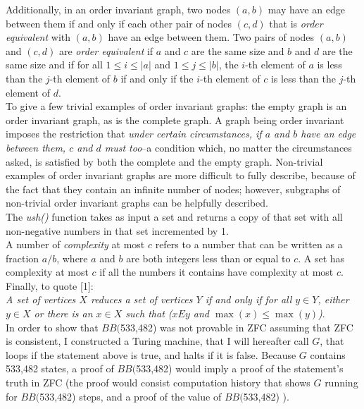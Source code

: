 \documentclass{report}
\newcommand{\statenum}{533,482 }
\newcommand{\bbstatenum}{$BB($533,482) }
\begin{document}
Additionally, in an order invariant graph, two nodes $(a,b)$ may have an edge between them if and only if each other pair of nodes $(c,d)$ that is \emph{order equivalent} with $(a,b)$ have an edge between them. Two pairs of nodes $(a, b)$ and $(c, d)$ are \emph{order equivalent} if $a$ and $c$ are the same size and $b$ and $d$ are the same size and if for all $1 \le i \le |a|$ and $1 \le j \le |b|$, the $i$-th element of $a$ is less than the $j$-th element of $b$ if and only if the $i$-th element of $c$ is less than the $j$-th element of $d$. \\

To give a few trivial examples of order invariant graphs: the empty graph is an order invariant graph, as is the complete graph. A graph being order invariant imposes the restriction that \emph{under certain circumstances, if $a$ and $b$ have an edge between them, $c$ and $d$ must too}--a condition which, no matter the circumstances asked, is satisfied by both the complete and the empty graph. Non-trivial examples of order invariant graphs are more difficult to fully describe, because of the fact that they contain an infinite number of nodes; however, subgraphs of non-trivial order invariant graphs can be helpfully described. \\ 


The \emph{ush()} function takes as input a set and returns a copy of that set with all non-negative numbers in that set incremented by 1. \\ 

A number of \emph{complexity} at most $c$ refers to a number that can be written as a fraction $a/b$, where $a$ and $b$ are both integers less than or equal to $c$. A set has complexity at most $c$ if all the numbers it contains have complexity at most $c$. \\ 

Finally, to quote [1]: \\

\emph{A set of vertices $X$ reduces a set of vertices $Y$ if and only if for all $y \in Y$, either $y \in X$ or there is an $x \in X$ such that ($x E y$ and $\max(x) \le \max(y)$)}. \\

In order to show that \bbstatenum was not provable in ZFC assuming that ZFC is consistent, I constructed a Turing machine, that I will hereafter call $G$, that loops if the statement above is true, and halts if it is false. Because $G$ contains \statenum states, a proof of \bbstatenum would imply a proof of the statement's truth in ZFC (the proof would consist computation history that shows $G$ running for \bbstatenum steps, and a proof of the value of \bbstatenum).
\end{document}
